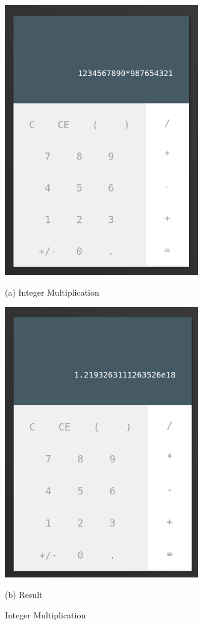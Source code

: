 \documentclass{article}
\begin{document}
\begin{normalsize}
  \begin{figure}[H]
    \begin{minipage}[b]{0.48\linewidth}
      \centering
      \centerline{\includegraphics[width=8.5cm]{10*}}
      \centerline{ (a) Integer Multiplication }\medskip
    \end{minipage}
    \hfill
    \begin{minipage}[b]{0.48\linewidth}
      \centering
      \centerline{\includegraphics[width=8.5cm]{10*res}}
      \centerline{ (b) Result }\medskip
    \end{minipage}
    \caption{Integer Multiplication}
  \end{figure}


\end{normalsize}
\end{document}
